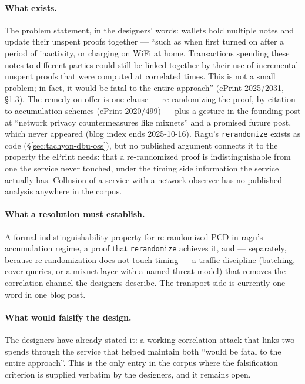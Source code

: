 \documentclass[11pt,a4paper]{article}
\theoremstyle{definition}
\begin{document}
\paragraph{What exists.} The problem statement, in the designers' words:
wallets hold multiple notes and update their unspent proofs together ---
``such as when first turned on after a period of inactivity, or charging on
WiFi at home. Transactions spending these notes to different parties could
still be linked together by their use of incremental unspent proofs that
were computed at correlated times. This is not a small problem; in fact, it
would be fatal to the entire approach'' (ePrint 2025/2031, \S1.3). The
remedy on offer is one clause --- re-randomizing the proof, by citation to
accumulation schemes (ePrint 2020/499) --- plus a gesture in the founding
post at ``network privacy countermeasures like mixnets'' and a promised
future post, which never appeared (blog index ends 2025-10-16).
\textsf{Ragu}'s \texttt{rerandomize} exists as code
(\S\ref{sec:tachyon-dbu-oss}), but no published argument connects it to the
property the ePrint needs: that a re-randomized proof is indistinguishable
from one the service never touched, under the timing side information the
service actually has. Collusion of a service with a network observer has no
published analysis anywhere in the corpus.

\paragraph{What a resolution must establish.} A formal indistinguishability
property for re-randomized PCD in \textsf{ragu}'s accumulation regime, a
proof that \texttt{rerandomize} achieves it, and --- separately, because
re-randomization does not touch timing --- a traffic discipline (batching,
cover queries, or a mixnet layer with a named threat model) that removes the
correlation channel the designers describe. The transport side is currently
one word in one blog post.

\paragraph{What would falsify the design.} The designers have already
stated it: a working correlation attack that links two spends through the
service that helped maintain both ``would be fatal to the entire
approach''. This is the only entry in the corpus where the falsification
criterion is supplied verbatim by the designers, and it remains open.
\end{document}
